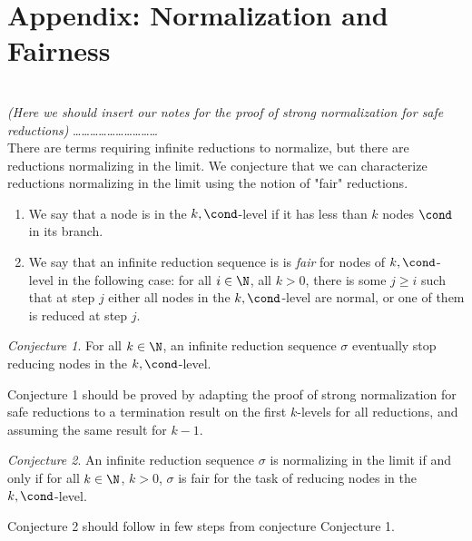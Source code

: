 \section{Appendix: Normalization and Fairness}
\label{section-normalization-fairness}
\\
\emph{(Here we should insert our notes for the proof of strong normalization for safe reductions)}
\ldots\ldots\ldots\ldots\ldots\ldots\ldots\ldots\ldots\ldots
\\

There are terms requiring infinite reductions to normalize, but there are reductions normalizing in the limit.
We conjecture that we can characterize reductions normalizing in the limit using the notion of "fair" reductions.

\begin{definition}
\begin{enumerate}
\item
We say that a node is in the $k,\cond$-level if it has less than $k$ nodes $\cond$ in its branch.
\item
We say that an infinite reduction sequence is is \emph{fair} for nodes of $k,\cond$-level in the following case:
for all $i\in \N$, all $k>0$, there is some  $j \ge i$ such that at step $j$ either all nodes in the 
$k,\cond$-level are normal, or one of them is reduced at step $j$.
\end{enumerate}
\end{definition}

\emph{Conjecture 1}. For all $k \in \N$, an infinite reduction sequence $\sigma$ 
eventually stop reducing nodes in the $k,\cond$-level.

Conjecture 1 should be proved by adapting the proof of strong normalization for safe reductions to a
termination result on the first $k$-levels for all reductions, and assuming the same result for $k-1$.

\emph{Conjecture 2}. An infinite reduction sequence $\sigma$ 
is normalizing in the limit if and only if for all $k \in \N$,
$k > 0$, $\sigma$ is fair for the task of reducing nodes in the $k,\cond$-level.

Conjecture 2 should follow in few steps from conjecture Conjecture 1.

